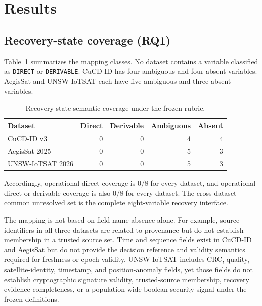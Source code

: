 \documentclass[preprint,12pt]{elsarticle}
\begin{document}
\section{Results}

\subsection{Recovery-state coverage (RQ1)}

Table~\ref{tab:coverage} summarizes the mapping classes. No dataset contains a variable classified as \texttt{DIRECT} or \texttt{DERIVABLE}. CuCD-ID has four ambiguous and four absent variables. AegisSat and UNSW-IoTSAT each have five ambiguous and three absent variables.

\begin{table}[htbp]
\centering
\caption{Recovery-state semantic coverage under the frozen rubric.}
\label{tab:coverage}
\begin{tabular}{lrrrr}
\toprule
Dataset & Direct & Derivable & Ambiguous & Absent \\
\midrule
CuCD-ID v3 & 0 & 0 & 4 & 4 \\
AegisSat 2025 & 0 & 0 & 5 & 3 \\
UNSW-IoTSAT 2026 & 0 & 0 & 5 & 3 \\
\bottomrule
\end{tabular}
\end{table}

Accordingly, operational direct coverage is 0/8 for every dataset, and operational direct-or-derivable coverage is also 0/8 for every dataset. The cross-dataset common unresolved set is the complete eight-variable recovery interface.

The mapping is not based on field-name absence alone. For example, source identifiers in all three datasets are related to provenance but do not establish membership in a trusted source set. Time and sequence fields exist in CuCD-ID and AegisSat but do not provide the decision reference and validity semantics required for freshness or epoch validity. UNSW-IoTSAT includes CRC, quality, satellite-identity, timestamp, and position-anomaly fields, yet those fields do not establish cryptographic signature validity, trusted-source membership, recovery evidence completeness, or a population-wide boolean security signal under the frozen definitions.
\end{document}

